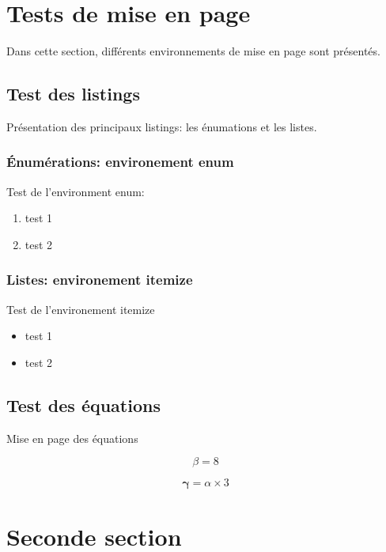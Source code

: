 \documentclass[letterpaper%
, twoside%
, 12pt%
,these%
,french
,creativecommons,hyperref,withAlgo2e%
]{thETS}
\begin{document}
\section{Tests de mise en page}

Dans cette section, différents environnements de mise en page sont présentés.

\subsection{Test des listings}

Présentation des principaux listings: les énumations et les listes.


\subsubsection{Énumérations: environement enum}

Test de l'environment enum:
\begin{enumerate}
 \item test 1
 \item test 2
\end{enumerate}

\subsubsection{Listes: environement itemize}

Test de l'environement itemize
\begin{itemize}
 \item test 1
 \item test 2
\end{itemize}

\subsection{Test des équations}

Mise en page des équations

\begin{equation}
   \beta = 8
\end{equation}

\begin{equation}
   \bm{\gamma} = \alpha \times 3
\end{equation}

\section{Seconde section}
\end{document}
